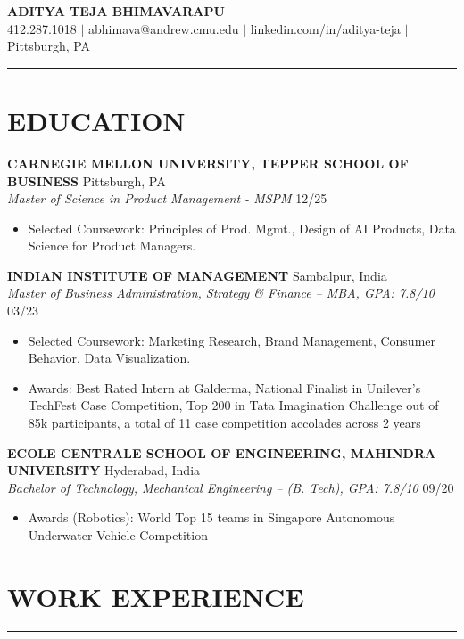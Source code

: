\documentclass[10pt,letterpaper]{article}
\newcommand{\sectionline}{\par\vspace{-0.5em}\noindent\rule{\textwidth}{0.6pt}\vspace{0.3em}\par}
\begin{document}
\begin{center}
  {\LARGE \textbf{ADITYA TEJA BHIMAVARAPU}}\\
  412.287.1018 $|$ abhimava@andrew.cmu.edu $|$ linkedin.com/in/aditya-teja $|$ Pittsburgh, PA
\end{center}
\sectionline

\section*{EDUCATION}

\noindent\textbf{CARNEGIE MELLON UNIVERSITY, TEPPER SCHOOL OF BUSINESS} \hfill Pittsburgh, PA\\
\textit{Master of Science in Product Management - MSPM} \hfill 12/25
\begin{itemize}
  \item Selected Coursework: Principles of Prod. Mgmt., Design of AI Products, Data Science for Product Managers.
\end{itemize}

\noindent\textbf{INDIAN INSTITUTE OF MANAGEMENT} \hfill Sambalpur, India\\
\textit{Master of Business Administration, Strategy \& Finance -- MBA, GPA: 7.8/10} \hfill 03/23
\begin{itemize}
  \item Selected Coursework: Marketing Research, Brand Management, Consumer Behavior, Data Visualization.
  \item Awards: Best Rated Intern at Galderma, National Finalist in Unilever's TechFest Case Competition, Top 200 in Tata Imagination Challenge out of 85k participants, a total of 11 case competition accolades across 2 years
\end{itemize}

\noindent\textbf{ECOLE CENTRALE SCHOOL OF ENGINEERING, MAHINDRA UNIVERSITY} \hfill Hyderabad, India\\
\textit{Bachelor of Technology, Mechanical Engineering -- (B. Tech), GPA: 7.8/10} \hfill 09/20
\begin{itemize}
  \item Awards (Robotics): World Top 15 teams in Singapore Autonomous Underwater Vehicle Competition
\end{itemize}

\section*{WORK EXPERIENCE}
\sectionline
\end{document}
